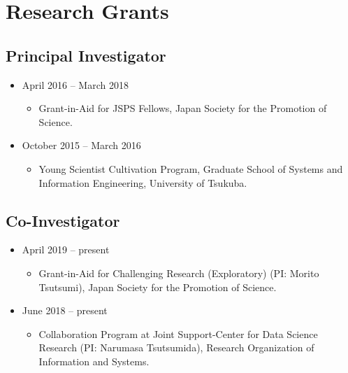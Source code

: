\documentclass[]{book}
\providecommand{\tightlist}{%
  \setlength{\itemsep}{0pt}\setlength{\parskip}{0pt}}
\begin{document}
\hypertarget{research-grants}{%
\section*{Research Grants}\label{research-grants}}

\hypertarget{principal-investigator}{%
\subsection*{Principal Investigator}\label{principal-investigator}}

\begin{itemize}
\tightlist
\item
  April 2016 -- March 2018

  \begin{itemize}
  \tightlist
  \item
    Grant-in-Aid for JSPS Fellows,
    Japan Society for the Promotion of Science.
  \end{itemize}
\item
  October 2015 -- March 2016

  \begin{itemize}
  \tightlist
  \item
    Young Scientist Cultivation Program,
    Graduate School of Systems and Information Engineering, University of Tsukuba.
  \end{itemize}
\end{itemize}

\hypertarget{co-investigator}{%
\subsection*{Co-Investigator}\label{co-investigator}}

\begin{itemize}
\tightlist
\item
  April 2019 -- present

  \begin{itemize}
  \tightlist
  \item
    Grant-in-Aid for Challenging Research (Exploratory) (PI: Morito Tsutsumi),
    Japan Society for the Promotion of Science.
  \end{itemize}
\item
  June 2018 -- present

  \begin{itemize}
  \tightlist
  \item
    Collaboration Program at Joint Support-Center for Data Science Research (PI: Narumasa Tsutsumida),
    Research Organization of Information and Systems.
  \end{itemize}
\end{itemize}
\end{document}
